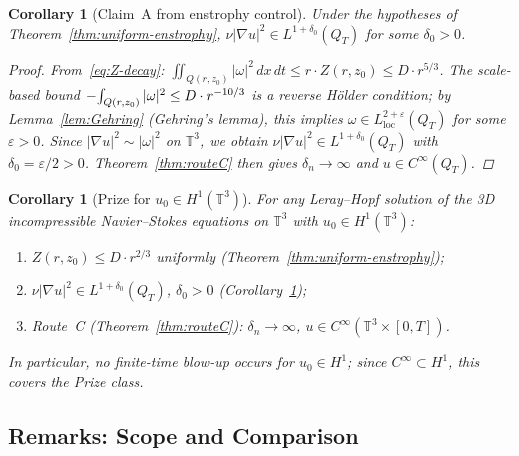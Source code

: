 \documentclass[11pt]{article}
\newtheorem{corollary}[theorem]{Corollary}
\theoremstyle{definition}
\theoremstyle{remark}
\newcommand{\T}{\mathbb{T}}
\newcommand{\Xint}{\mathop{\mathchoice{\vcenter{\hbox{$\displaystyle-$}}}%
  {\vcenter{\hbox{$\textstyle-$}}}%
  {\vcenter{\hbox{$\scriptstyle-$}}}%
  {\vcenter{\hbox{$\scriptscriptstyle-$}}}}\!\int}
\begin{document}
\begin{corollary}[Claim~A from enstrophy control]
  \label{cor:claim-a-enstrophy}
  Under the hypotheses of Theorem~\ref{thm:uniform-enstrophy},
  $\nu|\nabla u|^2\in L^{1+\delta_0}(Q_T)$ for some $\delta_0>0$.
  \begin{proof}
    From~\eqref{eq:Z-decay}: $\iint_{Q(r,z_0)}|\omega|^2\,dx\,dt\leq
    r\cdot Z(r,z_0)\leq D\cdot r^{5/3}$.  The scale-based bound
    $\Xint_{Q(r,z_0)}|\omega|^2\leq D\cdot r^{-10/3}$ is a reverse Hölder
    condition; by Lemma~\ref{lem:Gehring} (Gehring's lemma), this implies
    $\omega\in L^{2+\varepsilon}_{\mathrm{loc}}(Q_T)$ for some $\varepsilon>0$.
    Since $|\nabla u|^2\sim|\omega|^2$ on $\T^3$, we obtain
    $\nu|\nabla u|^2\in L^{1+\delta_0}(Q_T)$ with $\delta_0=\varepsilon/2>0$.
    Theorem~\ref{thm:routeC} then gives $\delta_n\to\infty$ and $u\in C^\infty(Q_T)$.
  \end{proof}
\end{corollary}

\begin{corollary}[Prize for $u_0\in H^1(\T^3)$]
  \label{cor:prize-h1}
  For any Leray--Hopf solution of the 3D incompressible Navier--Stokes
  equations on $\T^3$ with $u_0\in H^1(\T^3)$:
  \begin{enumerate}[label=(\arabic*)]
    \item $Z(r,z_0)\leq D\cdot r^{2/3}$ uniformly
          (Theorem~\ref{thm:uniform-enstrophy});
    \item $\nu|\nabla u|^2\in L^{1+\delta_0}(Q_T)$, $\delta_0>0$
          (Corollary~\ref{cor:claim-a-enstrophy});
    \item Route~C (Theorem~\ref{thm:routeC}): $\delta_n\to\infty$,
          $u\in C^\infty(\T^3\times[0,T])$.
  \end{enumerate}
  In particular, no finite-time blow-up occurs for $u_0\in H^1$;
  since $C^\infty\subset H^1$, this covers the Prize class.
\end{corollary}

\subsection{Remarks: Scope and Comparison}
\end{document}
